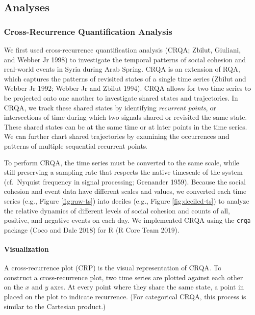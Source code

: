 \documentclass[
  english,
  man]{apa6}
\let\oldparagraph\paragraph
\renewcommand{\paragraph}[1]{\oldparagraph{#1}\mbox{}}
\begin{document}
\hypertarget{analyses}{%
\subsection{Analyses}\label{analyses}}

\hypertarget{cross-recurrence-quantification-analysis}{%
\subsubsection{Cross-Recurrence Quantification Analysis}\label{cross-recurrence-quantification-analysis}}

We first used cross-recurrence quantification analysis (CRQA; Zbilut, Giuliani, and Webber Jr 1998) to investigate the temporal patterns of social cohesion
and real-world events in Syria during Arab Spring. CRQA is an extension of RQA,
which captures the patterns of revisited states of a single time series
(Zbilut and Webber Jr 1992; Webber Jr and Zbilut 1994). CRQA allows for two time series
to be projected onto one another to investigate shared states and trajectories.
In CRQA, we track these shared states by identifying \emph{recurrent points}, or
intersections of time during which two signals shared or revisited the same
state. These shared states can be at the same time or at later points in the
time series. We can further chart shared trajectories by examining the
occurrences and patterns of multiple sequential recurrent points.

To perform CRQA, the time series must be converted to the same scale, while
still preserving a sampling rate that respects the native timescale of the
system (cf.~Nyquist frequency in signal processing; Grenander 1959).
Because the social cohesion and event data have different scales and values, we
converted each time series (e.g., Figure \ref{fig:raw-ts}) into deciles (e.g.,
Figure \ref{fig:deciled-ts}) to analyze the relative dynamics of different
levels of social cohesion and counts of all, positive, and negative events on
each day. We implemented CRQA using the \texttt{crqa} package (Coco and Dale 2018) for R
(R Core Team 2019).

\hypertarget{visualization}{%
\paragraph{Visualization}\label{visualization}}

A cross-recurrence plot (CRP) is the visual representation of CRQA. To construct
a cross-recurrence plot, two time series are plotted against each other on the
\(x\) and \(y\) axes. At every point where they share the same state, a point in
placed on the plot to indicate recurrence. (For categorical CRQA, this process
is similar to the Cartesian product.)
\end{document}
